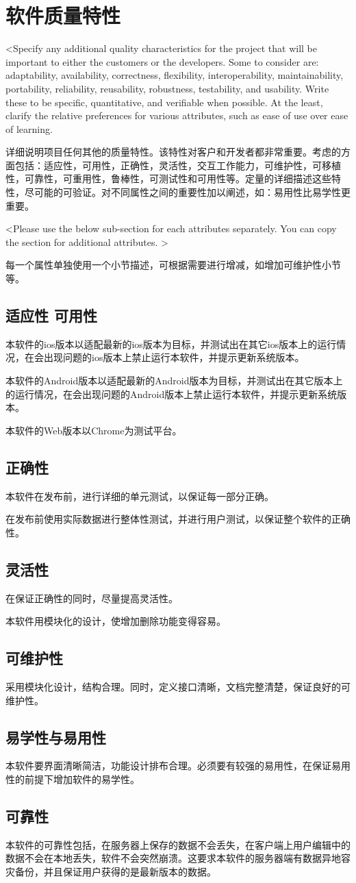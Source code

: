 \chapter{软件质量特性}
<Specify any additional quality characteristics for the project that will be important to either the customers or the developers. Some to consider are: adaptability, availability, correctness, flexibility, interoperability, maintainability, portability, reliability, reusability, robustness, testability, and usability. Write these to be specific, quantitative, and verifiable when possible. At the least, clarify the relative preferences for various attributes, such as ease of use over ease of learning.

详细说明项目任何其他的质量特性。该特性对客户和开发者都非常重要。考虑的方面包括：适应性，可用性，正确性，灵活性，交互工作能力，可维护性，可移植性，可靠性，可重用性，鲁棒性，可测试性和可用性等。定量的详细描述这些特性，尽可能的可验证。对不同属性之间的重要性加以阐述，如：易用性比易学性更重要。

<Please use the below sub-section for each attributes separately. You can copy the section for additional attributes. >

每一个属性单独使用一个小节描述，可根据需要进行增减，如增加可维护性小节等。

	\section{适应性 可用性}
	本软件的ios版本以适配最新的ios版本为目标，并测试出在其它ios版本上的运行情况，在会出现问题的ios版本上禁止运行本软件，并提示更新系统版本。

	本软件的Android版本以适配最新的Android版本为目标，并测试出在其它版本上的运行情况，在会出现问题的Android版本上禁止运行本软件，并提示更新系统版本。 

	本软件的Web版本以Chrome为测试平台。
	\section{正确性}
	本软件在发布前，进行详细的单元测试，以保证每一部分正确。

	在发布前使用实际数据进行整体性测试，并进行用户测试，以保证整个软件的正确性。

	\section{灵活性}
	在保证正确性的同时，尽量提高灵活性。

	本软件用模块化的设计，使增加删除功能变得容易。
	
	\section{可维护性}
	采用模块化设计，结构合理。同时，定义接口清晰，文档完整清楚，保证良好的可维护性。
	
	\section{易学性与易用性}
	本软件要界面清晰简洁，功能设计排布合理。必须要有较强的易用性，在保证易用性的前提下增加软件的易学性。 

	\section{可靠性}
	本软件的可靠性包括，在服务器上保存的数据不会丢失，在客户端上用户编辑中的数据不会在本地丢失，软件不会突然崩溃。这要求本软件的服务器端有数据异地容灾备份，并且保证用户获得的是最新版本的数据。